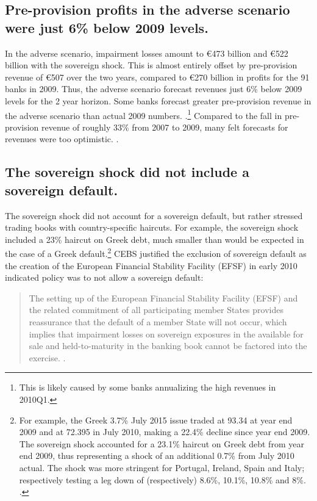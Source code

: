 \documentclass[12pt]{article}
\begin{document}
\subsection{Pre-provision profits in the adverse scenario were just 6\% below 2009 levels.}

In the adverse scenario, impairment losses amount to \euro{473} billion and \euro{522} billion with the sovereign shock. This is almost entirely offset by pre-provision revenue of \euro{507} over the two years, compared to \euro{270} billion in profits for the 91 banks in 2009. Thus, the adverse scenario forecast revenues just 6\% below 2009 levels for the 2 year horizon. Some banks forecast greater pre-provision revenue in the adverse scenario than actual 2009 numbers. \citep{Deutsche}.\footnote{This is likely caused by some banks annualizing the high revenues in 2010Q1.} Compared to the fall in pre-provision revenue of roughly 33\% from 2007 to 2009, many felt forecasts for revenues were too optimistic. \citep{Samuels}.

\subsection{The sovereign shock did not include a sovereign default.}

The sovereign shock did not account for a sovereign default, but rather stressed trading books with country-specific haircuts. For example, the sovereign shock included a 23\% haircut on Greek debt, much smaller than would be expected in the case of a Greek default.\footnote{For example, the Greek 3.7\% July 2015 issue traded at 93.34 at year end 2009 and at 72.395 in July 2010, making a 22.4\% decline since year end 2009. The sovereign shock accounted for a 23.1\% haircut on Greek debt from year end 2009, thus representing a shock of an additional 0.7\% from July 2010 actual. The shock was more stringent for Portugal, Ireland, Spain and Italy; respectively testing a leg down of (respectively) 8.6\%, 10.1\%, 10.8\% and 8\%. \citep{Danske}.} CEBS justified the exclusion of sovereign default as the creation of the European Financial Stability Facility (EFSF) in early 2010 indicated policy was to not allow a sovereign default:

\begin{quote}
The setting up of the European Financial Stability Facility (EFSF) and the related commitment of all participating member States provides reassurance that the default of a member State will not occur, which implies that impairment losses on sovereign exposures in the available for sale and held-to-maturity in the banking book cannot be factored into the exercise. \citep{QA}.
\end{quote}
\end{document}
